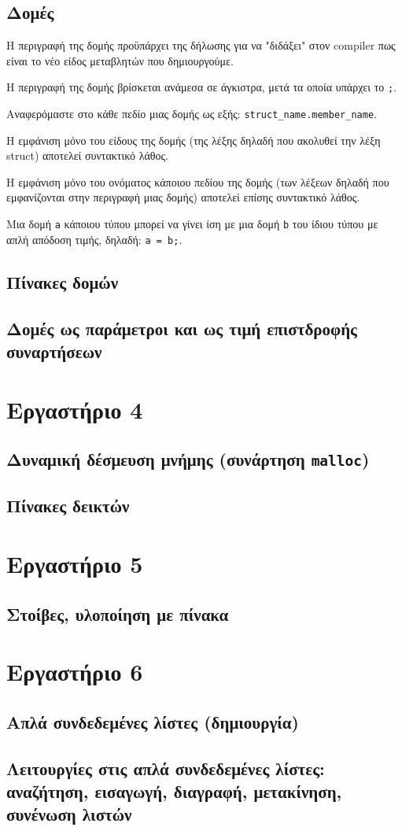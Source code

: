 \documentclass[14pt, fleqn, leqno]{extreport}
\begin{document}
\section{Δομές}

Η περιγραφή της δομής προϋπάρχει της δήλωσης για να "διδάξει" στον compiler πως είναι το νέο είδος μεταβλητών που δημιουργούμε.

Η περιγραφή της δομής βρίσκεται ανάμεσα σε άγκιστρα, μετά τα οποία υπάρχει το \lstinline{;}.

Αναφερόμαστε στο κάθε πεδίο μιας δομής ως εξής: \lstinline{struct_name.member_name}.

Η εμφάνιση μόνο του είδους της δομής (της λέξης δηλαδή που ακολυθεί την λέξη struct) αποτελεί συντακτικό λάθος.

Η εμφάνιση μόνο του ονόματος κάποιου πεδίου της δομής (των λέξεων δηλαδή που εμφανίζονται στην περιγραφή μιας δομής) αποτελεί επίσης συντακτικό λάθος.

Μια δομή \lstinline{a} κάποιου τύπου μπορεί να γίνει ίση με μια δομή \lstinline{b} του ίδιου τύπου με απλή απόδοση τιμής, δηλαδή: \lstinline{a = b;}.

\section{Πίνακες δομών}
\section{Δομές ως παράμετροι και ως τιμή επιστδροφής συναρτήσεων}

\chapter{Εργαστήριο 4}

\section{Δυναμική δέσμευση μνήμης (συνάρτηση \lstinline{malloc})}
\section{Πίνακες δεικτών}

\chapter{Εργαστήριο 5}

\section{Στοίβες, υλοποίηση με πίνακα}

\chapter{Εργαστήριο 6}

\section{Απλά συνδεδεμένες λίστες (δημιουργία)}
\section{Λειτουργίες στις απλά συνδεδεμένες λίστες: αναζήτηση, εισαγωγή, διαγραφή, μετακίνηση, συνένωση λιστών}
\end{document}
